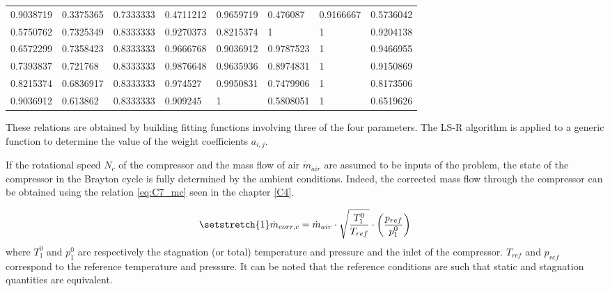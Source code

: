 \begin{longtable}[c]{@{}llll|llll@{}}
0.9038719                   & 0.3375365                & 0.7333333            & 0.4711212                 & 0.9659719                   & 0.476087                 & 0.9166667            & 0.5736042                 \\
0.5750762                   & 0.7325349                & 0.8333333            & 0.9270373                 & 0.8215374                   & 1                        & 1                    & 0.9204138                 \\
0.6572299                   & 0.7358423                & 0.8333333            & 0.9666768                 & 0.9036912                   & 0.9787523                & 1                    & 0.9466955                 \\
0.7393837                   & 0.721768                 & 0.8333333            & 0.9876648                 & 0.9635936                   & 0.8974831                & 1                    & 0.9150869                 \\
0.8215374                   & 0.6836917                & 0.8333333            & 0.974527                  & 0.9950831                   & 0.7479906                & 1                    & 0.8173506                 \\
0.9036912                   & 0.613862                 & 0.8333333            & 0.909245                  & 1                           & 0.5808051                & 1                    & 0.6519626                 \\* \bottomrule
\end{longtable}
These relations are obtained by building fitting functions involving three of the four parameters. The LS-R algorithm is applied to a generic function to determine the value of the weight coefficients $a_{i,j}$. 

If the rotational speed $N_c$ of the compressor and the mass flow of air $\dot{m}_{air}$ are assumed to be inputs of the problem, the state of the compressor in the Brayton cycle is fully determined by the ambient conditions. Indeed, the corrected mass flow through the compressor can be obtained using the relation \ref{eq:C7_mc}
seen in the chapter \ref{C4}.

\begin{equation}
    \setstretch{1}
    \dot{m}_{corr,c} = \dot{m}_{air}\cdot \sqrt{\frac{T_1^0}{T_{ref}}}\cdot\left(\frac{p_{ref}}{p_1^0}\right)\label{eq:C7_mc}
\end{equation}
where $T_1^0$ and $p_1^0$ are respectively the stagnation (or total) temperature and pressure and the inlet of the compressor. $T_{ref}$ and $p_{ref}$ correspond to the reference temperature and pressure. It can be noted that the reference conditions are such that static and stagnation quantities are equivalent.

